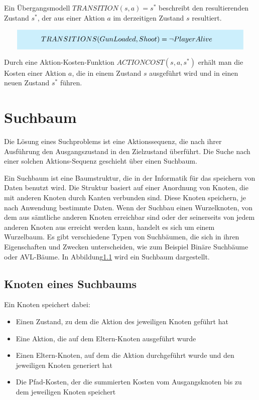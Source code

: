 Ein Übergangsmodell $TRANSITION(s,a) = s^*$ beschreibt den resultierenden Zustand $s^*$, der aus einer Aktion $a$ im derzeitigen Zustand $s$ resultiert.

\[
\highlightbox{0.9\textwidth}{$
    \begin{aligned}
			TRANSITIONS(GunLoaded, Shoot) &= \lnot PlayerAlive
    \end{aligned}
$}
\]

Durch eine Aktion-Kosten-Funktion $ACTIONCOST(s,a,s^*)$ erhält man die Kosten einer Aktion $a$, die in einem Zustand $s$ ausgeführt wird und in einen neuen Zustand $s^*$ führen.

\section{Suchbaum}

Die Lösung eines Suchproblems ist eine Aktionssequenz, die nach ihrer Ausführung den Ausgangszustand in den Zielzustand überführt. Die Suche nach einer solchen Aktions-Sequenz geschieht über einen Suchbaum.

Ein Suchbaum ist eine Baumstruktur, die in der Informatik für das speichern von Daten benutzt wird. Die Struktur basiert auf einer Anordnung von Knoten, die mit anderen Knoten durch Kanten verbunden sind. Diese Knoten speichern, je nach Anwendung bestimmte Daten. Wenn der Suchbau einen Wurzelknoten, von dem aus sämtliche anderen Knoten erreichbar sind oder der seinerseits von jedem anderen Knoten aus erreicht werden kann, handelt es sich um einem Wurzelbaum. Es gibt verschiedene Typen von Suchbäumen, die sich in ihren Eigenschaften und Zwecken unterscheiden, wie zum Beispiel Binäre Suchbäume oder AVL-Bäume. In Abbildung\ref{} wird ein Suchbaum dargestellt.

\subsection{Knoten eines Suchbaums}
Ein Knoten speichert dabei:
\begin{itemize}
	\item Einen Zustand, zu dem die Aktion des jeweiligen Knoten geführt hat
	\item Eine Aktion, die auf dem Eltern-Knoten ausgeführt wurde
	\item Einen Eltern-Knoten, auf dem die Aktion durchgeführt wurde und den jeweiligen Knoten generiert hat
	\item Die Pfad-Kosten, der die summierten Kosten vom Ausgangsknoten bis zu dem jeweiligen Knoten speichert
\end{itemize}

